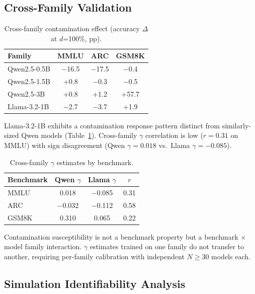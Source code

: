 \documentclass[11pt,a4paper]{article}
\begin{document}
\subsection{Cross-Family Validation}
\label{sec:cross}

\begin{table}[h]
\centering
\caption{Cross-family contamination effect (accuracy $\Delta$ at $d$=100\%, pp).}
\label{tab:cross_family}
\begin{tabular}{lccc}
\toprule
Family & MMLU & ARC & GSM8K \\
\midrule
Qwen2.5-0.5B & $-$16.5 & $-$17.5 & $-$0.4 \\
Qwen2.5-1.5B & +0.8 & $-$0.3 & $-$0.5 \\
Qwen2.5-3B & +0.8 & +1.2 & +57.7 \\
Llama-3.2-1B & $-$2.7 & $-$3.7 & +1.9 \\
\bottomrule
\end{tabular}
\end{table}

Llama-3.2-1B exhibits a contamination response pattern distinct from similarly-sized Qwen models (Table~\ref{tab:cross_family}).
Cross-family $\gamma$ correlation is low ($r = 0.31$ on MMLU) with sign disagreement (Qwen $\gamma = 0.018$ vs.\ Llama $\gamma = -0.085$).

\begin{table}[h]
\centering
\caption{Cross-family $\gamma$ estimates by benchmark.}
\label{tab:cross_gamma}
\begin{tabular}{lccc}
\toprule
Benchmark & Qwen $\gamma$ & Llama $\gamma$ & $r$ \\
\midrule
MMLU & 0.018 & $-$0.085 & 0.31 \\
ARC & $-$0.032 & $-$0.112 & 0.58 \\
GSM8K & 0.310 & 0.065 & 0.22 \\
\bottomrule
\end{tabular}
\end{table}

Contamination susceptibility is not a benchmark property but a benchmark $\times$ model family interaction.
$\gamma$ estimates trained on one family do not transfer to another, requiring per-family calibration with independent $N \geq 30$ models each.

\subsection{Simulation Identifiability Analysis}
\label{sec:sim}
\end{document}
